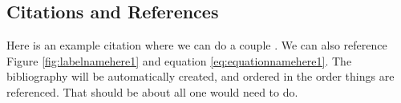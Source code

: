 \subsection{Citations and References}


Here is an example citation \cite{Eckenhoff2016WAFR} where we can do a couple \cite{Huang2014ICRA,Eckenhoff2015ACC}.
%
We can also reference Figure \ref{fig:labelnamehere1} and equation \eqref{eq:equationnamehere1}.
%
The bibliography will be automatically created, and ordered in the order things are referenced.
That should be about all one would need to do.





